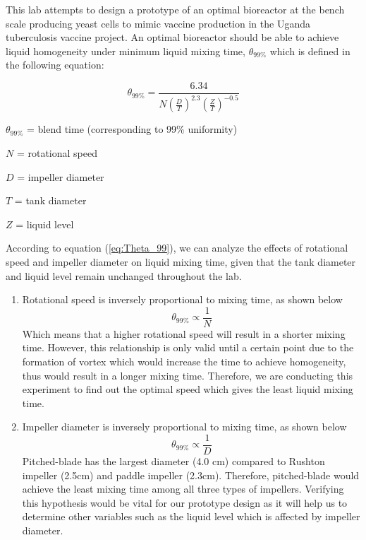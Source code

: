 This lab attempts to design a prototype of an optimal bioreactor at the bench scale producing yeast cells to mimic vaccine production in the Uganda tuberculosis vaccine project.
An optimal bioreactor should be able to achieve liquid homogeneity under minimum liquid mixing time,
$\theta_{99\%} $
which is defined in the following equation:  

 \begin{equation} \label{eq:Theta_99}
 	\theta_{99\%} = \frac{6.34}{
		N \left( \frac{D}{T} \right)^{2.3}
		{\left( \frac{Z}{T} \right)}^{-0.5}
	}
 \end{equation}
 
 $\theta_{99\%}$ = blend time (corresponding to 99\% uniformity)  
 
 $N$ = rotational speed  
 
 $D$ = impeller diameter  
 
 $T$ = tank diameter  
 
 $Z$ = liquid level 
 
 According to equation (\ref{eq:Theta_99}), we can analyze the effects of rotational speed and impeller diameter on liquid mixing time, given that the tank diameter and liquid level remain unchanged throughout the lab.
 
 \begin{enumerate}
 	\item Rotational speed is inversely proportional to mixing time, as shown below\begin{equation}
 		\theta_{99\%} \propto \frac{1}{N}
 	\end{equation}
 	Which means that a higher rotational speed will result in a shorter mixing time. However, this relationship is only valid until a certain point due to the formation of vortex which would increase the time to achieve homogeneity, thus would result in a longer mixing time. Therefore, we are conducting this experiment to find out the optimal speed which gives the least liquid mixing time.  
 	\item Impeller diameter is inversely proportional to mixing time, as shown below
		\begin{equation}
	 		\theta_{99\%} \propto \frac{1}{D}
		\end{equation}
 	Pitched-blade has the largest diameter (4.0 cm) compared to Rushton impeller (2.5cm) and paddle impeller (2.3cm). Therefore, pitched-blade would achieve the least mixing time among all three types of impellers. Verifying this hypothesis would be vital for our prototype design as it will help us to determine other variables such as the liquid level which is affected by impeller diameter. 
\end{enumerate}

